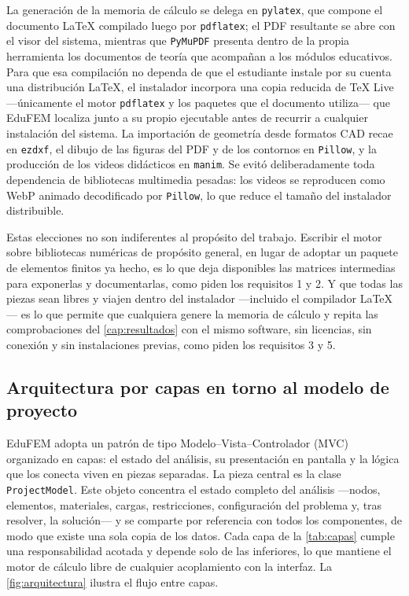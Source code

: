 La generación de la memoria de cálculo se delega en \texttt{pylatex}, que compone el documento \LaTeX{} compilado luego por \texttt{pdflatex}; el PDF resultante se abre con el visor del sistema, mientras que \texttt{PyMuPDF} presenta dentro de la propia herramienta los documentos de teoría que acompañan a los módulos educativos. Para que esa compilación no dependa de que el estudiante instale por su cuenta una distribución \LaTeX{}, el instalador incorpora una copia reducida de \TeX{} Live —únicamente el motor \texttt{pdflatex} y los paquetes que el documento utiliza— que EduFEM localiza junto a su propio ejecutable antes de recurrir a cualquier instalación del sistema. La importación de geometría desde formatos CAD recae en \texttt{ezdxf}, el dibujo de las figuras del PDF y de los contornos en \texttt{Pillow}, y la producción de los videos didácticos en \texttt{manim}. Se evitó deliberadamente toda dependencia de bibliotecas multimedia pesadas: los videos se reproducen como WebP animado decodificado por \texttt{Pillow}, lo que reduce el tamaño del instalador distribuible.

Estas elecciones no son indiferentes al propósito del trabajo. Escribir el motor sobre bibliotecas numéricas de propósito general, en lugar de adoptar un paquete de elementos finitos ya hecho, es lo que deja disponibles las matrices intermedias para exponerlas y documentarlas, como piden los requisitos 1 y 2. Y que todas las piezas sean libres y viajen dentro del instalador —incluido el compilador \LaTeX{}— es lo que permite que cualquiera genere la memoria de cálculo y repita las comprobaciones del \autoref{cap:resultados} con el mismo software, sin licencias, sin conexión y sin instalaciones previas, como piden los requisitos 3 y 5.

\subsection{Arquitectura por capas en torno al modelo de proyecto}
\label{sec:arquitectura}

EduFEM adopta un patrón de tipo Modelo--Vista--Controlador (MVC) organizado en capas: el estado del análisis, su presentación en pantalla y la lógica que los conecta viven en piezas separadas. La pieza central es la clase \texttt{ProjectModel}. Este objeto concentra el estado completo del análisis —nodos, elementos, materiales, cargas, restricciones, configuración del problema y, tras resolver, la solución— y se comparte por referencia con todos los componentes, de modo que existe una sola copia de los datos. Cada capa de la \autoref{tab:capas} cumple una responsabilidad acotada y depende solo de las inferiores, lo que mantiene el motor de cálculo libre de cualquier acoplamiento con la interfaz. La \autoref{fig:arquitectura} ilustra el flujo entre capas.

